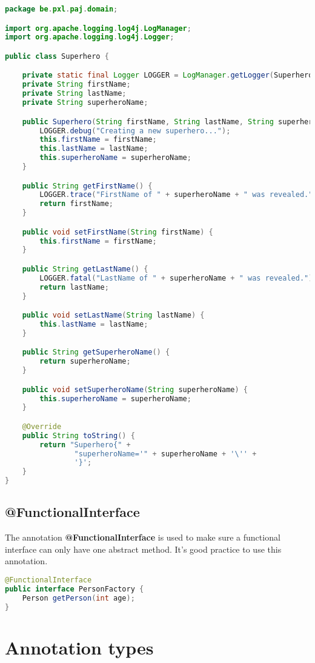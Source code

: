 \begin{lstlisting}[frame=single,language=java]
package be.pxl.paj.domain;

import org.apache.logging.log4j.LogManager;
import org.apache.logging.log4j.Logger;

public class Superhero {

	private static final Logger LOGGER = LogManager.getLogger(Superhero.class);
	private String firstName;
	private String lastName;
	private String superheroName;

	public Superhero(String firstName, String lastName, String superheroName) {
		LOGGER.debug("Creating a new superhero...");
		this.firstName = firstName;
		this.lastName = lastName;
		this.superheroName = superheroName;
	}

	public String getFirstName() {
		LOGGER.trace("FirstName of " + superheroName + " was revealed.");
		return firstName;
	}

	public void setFirstName(String firstName) {
		this.firstName = firstName;
	}

	public String getLastName() {
		LOGGER.fatal("LastName of " + superheroName + " was revealed.");
		return lastName;
	}

	public void setLastName(String lastName) {
		this.lastName = lastName;
	}

	public String getSuperheroName() {
		return superheroName;
	}

	public void setSuperheroName(String superheroName) {
		this.superheroName = superheroName;
	}

	@Override
	public String toString() {
		return "Superhero{" +
				"superheroName='" + superheroName + '\'' +
				'}';
	}
}
\end{lstlisting}

\subsection{@FunctionalInterface}

The annotation \textbf{@FunctionalInterface} is used to make sure a functional interface can only have one abstract method.  It's good practice to use this annotation.

\begin{lstlisting}[frame=single,language=java]
@FunctionalInterface
public interface PersonFactory {
    Person getPerson(int age);
}
\end{lstlisting}


\section{Annotation types}

